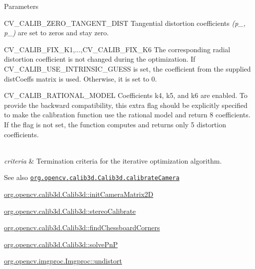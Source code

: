 {\begin{DoxyParams}{Parameters}
\begin{DoxyItemize}
\item C\+V\+\_\+\+C\+A\+L\+I\+B\+\_\+\+Z\+E\+R\+O\+\_\+\+T\+A\+N\+G\+E\+N\+T\+\_\+\+D\+I\+ST Tangential distortion coefficients {\itshape (p\+\_, p\+\_)} are set to zeros and stay zero. 
\item C\+V\+\_\+\+C\+A\+L\+I\+B\+\_\+\+F\+I\+X\+\_\+\+K1,...,C\+V\+\_\+\+C\+A\+L\+I\+B\+\_\+\+F\+I\+X\+\_\+\+K6 The corresponding radial distortion coefficient is not changed during the optimization. If {\ttfamily C\+V\+\_\+\+C\+A\+L\+I\+B\+\_\+\+U\+S\+E\+\_\+\+I\+N\+T\+R\+I\+N\+S\+I\+C\+\_\+\+G\+U\+E\+SS} is set, the coefficient from the supplied {\ttfamily dist\+Coeffs} matrix is used. Otherwise, it is set to 0. 
\item C\+V\+\_\+\+C\+A\+L\+I\+B\+\_\+\+R\+A\+T\+I\+O\+N\+A\+L\+\_\+\+M\+O\+D\+EL Coefficients k4, k5, and k6 are enabled. To provide the backward compatibility, this extra flag should be explicitly specified to make the calibration function use the rational model and return 8 coefficients. If the flag is not set, the function computes and returns only 5 distortion coefficients. 
\end{DoxyItemize}\\
\hline
{\em criteria} & Termination criteria for the iterative optimization algorithm.\\
\hline
\end{DoxyParams}
\begin{DoxySeeAlso}{See also}
\href{http://docs.opencv.org/modules/calib3d/doc/camera_calibration_and_3d_reconstruction.html#calibratecamera}{\tt org.\+opencv.\+calib3d.\+Calib3d.\+calibrate\+Camera} 

\mbox{\hyperlink{classorg_1_1opencv_1_1calib3d_1_1_calib3d_a15df47d3a4b4a3ef48f13d1c09aae9cb}{org.\+opencv.\+calib3d.\+Calib3d\+::init\+Camera\+Matrix2D}} 

\mbox{\hyperlink{classorg_1_1opencv_1_1calib3d_1_1_calib3d_af2197ce033076b13fef5ae2fc045aa62}{org.\+opencv.\+calib3d.\+Calib3d\+::stereo\+Calibrate}} 

\mbox{\hyperlink{classorg_1_1opencv_1_1calib3d_1_1_calib3d_a5a4ea03ae303cf3c5a327ec5c85047a5}{org.\+opencv.\+calib3d.\+Calib3d\+::find\+Chessboard\+Corners}} 

\mbox{\hyperlink{classorg_1_1opencv_1_1calib3d_1_1_calib3d_ad53b5772231896ec5baf3bde5e9ba319}{org.\+opencv.\+calib3d.\+Calib3d\+::solve\+PnP}} 

\mbox{\hyperlink{classorg_1_1opencv_1_1imgproc_1_1_imgproc_a0733bf11be8125dfc28b6ff4da746927}{org.\+opencv.\+imgproc.\+Imgproc\+::undistort}} 
\end{DoxySeeAlso}
}\mbox{\label{classorg_1_1opencv_1_1calib3d_1_1_calib3d_a1cd08cb110fd228c1feac4c47e5f2129}} 
